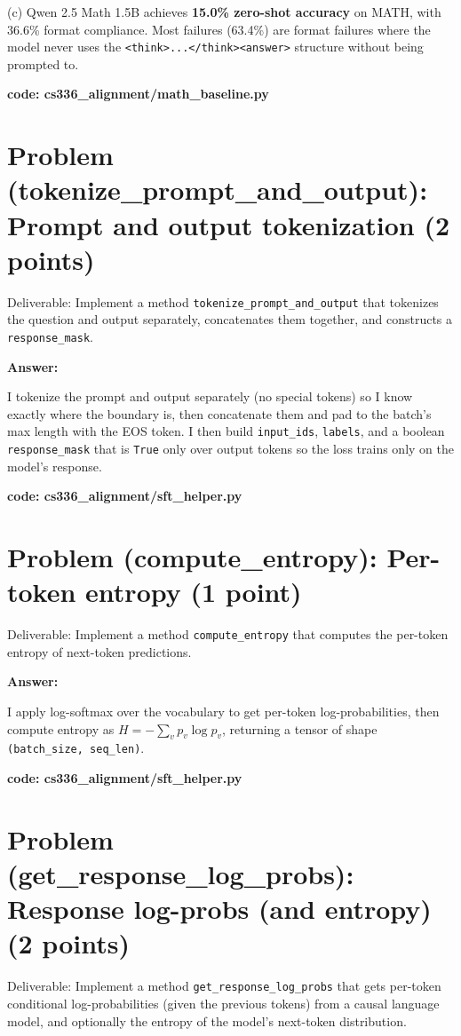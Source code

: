 \documentclass{article}
\begin{document}
(c) Qwen 2.5 Math 1.5B achieves \textbf{15.0\% zero-shot accuracy} on MATH, with 36.6\% format compliance.
Most failures (63.4\%) are format failures where the model never uses the \texttt{<think>...</think><answer>} structure without being prompted to.

\textbf{code: cs336\_alignment/math\_baseline.py}


\section*{Problem (tokenize\_prompt\_and\_output): Prompt and output tokenization (2 points)} %
Deliverable: Implement a method \texttt{tokenize\_prompt\_and\_output} that tokenizes the question and output separately, concatenates them together, and constructs a \texttt{response\_mask}. %

\textbf{Answer:}

I tokenize the prompt and output separately (no special tokens) so I know exactly where the boundary is, then concatenate them and pad to the batch's max length with the EOS token. I then build \texttt{input\_ids}, \texttt{labels}, and a boolean \texttt{response\_mask} that is \texttt{True} only over output tokens so the loss trains only on the model's response.

\textbf{code: cs336\_alignment/sft\_helper.py}


\section*{Problem (compute\_entropy): Per-token entropy (1 point)} %
Deliverable: Implement a method \texttt{compute\_entropy} that computes the per-token entropy of next-token predictions. %

\textbf{Answer:}

I apply log-softmax over the vocabulary to get per-token log-probabilities, then compute entropy as $H = -\sum_v p_v \log p_v$, returning a tensor of shape \texttt{(batch\_size, seq\_len)}.

\textbf{code: cs336\_alignment/sft\_helper.py}


\section*{Problem (get\_response\_log\_probs): Response log-probs (and entropy) (2 points)} %
Deliverable: Implement a method \texttt{get\_response\_log\_probs} that gets per-token conditional log-probabilities (given the previous tokens) from a causal language model, and optionally the entropy of the model's next-token distribution. %
\end{document}
